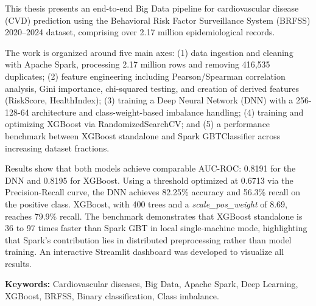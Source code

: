This thesis presents an end-to-end Big Data pipeline for cardiovascular disease (CVD) prediction using the Behavioral Risk Factor Surveillance System (BRFSS) 2020--2024 dataset, comprising over 2.17 million epidemiological records.

The work is organized around five main axes: (1) data ingestion and cleaning with Apache Spark, processing 2.17 million rows and removing 416,535 duplicates; (2) feature engineering including Pearson/Spearman correlation analysis, Gini importance, chi-squared testing, and creation of derived features (RiskScore, HealthIndex); (3) training a Deep Neural Network (DNN) with a 256-128-64 architecture and class-weight-based imbalance handling; (4) training and optimizing XGBoost via RandomizedSearchCV; and (5) a performance benchmark between XGBoost standalone and Spark GBTClassifier across increasing dataset fractions.

Results show that both models achieve comparable AUC-ROC: 0.8191 for the DNN and 0.8195 for XGBoost. Using a threshold optimized at 0.6713 via the Precision-Recall curve, the DNN achieves 82.25\% accuracy and 56.3\% recall on the positive class. XGBoost, with 400 trees and a \textit{scale\_pos\_weight} of 8.69, reaches 79.9\% recall. The benchmark demonstrates that XGBoost standalone is 36 to 97 times faster than Spark GBT in local single-machine mode, highlighting that Spark's contribution lies in distributed preprocessing rather than model training. An interactive Streamlit dashboard was developed to visualize all results.

\vspace{0.4cm}
\textbf{Keywords:} Cardiovascular diseases, Big Data, Apache Spark, Deep Learning, XGBoost, BRFSS, Binary classification, Class imbalance.

\newpage
